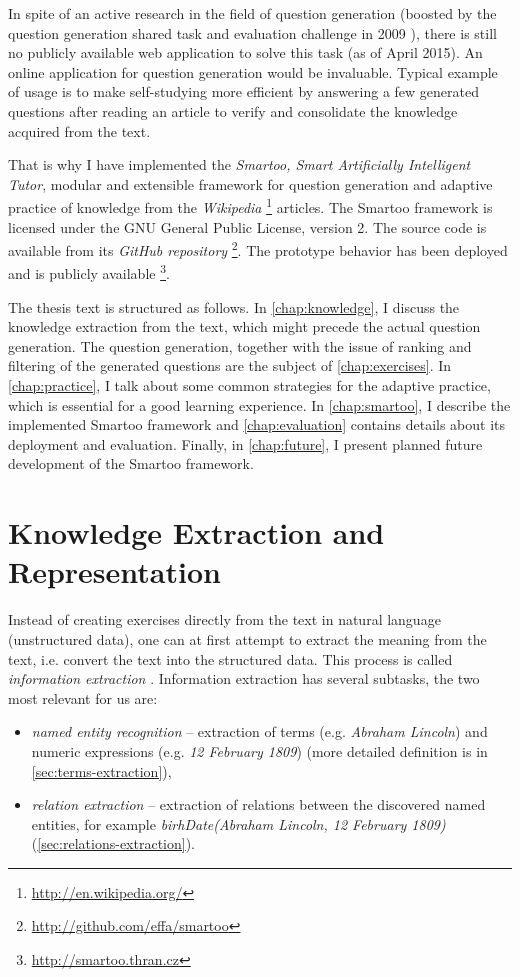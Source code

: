 \documentclass[12pt, twoside]{fithesis2}
\renewcommand{\_}{\leavevmode \kern0.07em\vbox{\hrule width0.4em}}
\newcommand{\squarebullet}{\textcolor{black}{\raisebox{0.15em}{\rule{4pt}{4pt}}}}
\newcommand{\emptysquarebullet}{\textcolor{black}{\raisebox{0.10em}{\tiny$\square$}}}
\newenvironment{myItemize}{
  \begin{itemize}[leftmargin=2em,rightmargin=1em,itemsep=\parskip ,parsep=0em,topsep=0em,partopsep=0em]
  \renewcommand{\labelitemi}{\squarebullet}
  \renewcommand{\labelitemii}{\textbullet}
}{
  \end{itemize}
}
\begin{document}
In spite of an active research in the field of question generation
(boosted by the question generation shared task and evaluation challenge in 2009 \cite{shared-task2009}),
there is still no publicly available web application to solve this task (as of April 2015).
An online application for question generation would be invaluable.
Typical example of usage is to make self-studying more efficient by answering a few generated questions after reading an article to verify and consolidate the knowledge acquired from the text.

That is why I have implemented the \textit{Smartoo, Smart Artificially Intelligent Tutor}, modular and extensible framework for question generation and adaptive practice
of knowledge from the \emph{Wikipedia}%
\footnote{\url{http://en.wikipedia.org/}}
articles.
The Smartoo framework is licensed under the GNU General Public License, version 2.
The source code is available from its \textit{GitHub repository}%
\footnote{\url{http://github.com/effa/smartoo}}.
The prototype behavior has been deployed and is publicly available%
\footnote{\url{http://smartoo.thran.cz}}.

The thesis text is structured as follows.
In \autoref{chap:knowledge}, I discuss the knowledge extraction from the text,
which might precede the actual question generation.
The question generation, together with the issue of ranking and filtering of the generated questions are the subject of \autoref{chap:exercises}.
In \autoref{chap:practice}, I talk about some common strategies for the adaptive practice, which is essential for a good learning experience.
In \autoref{chap:smartoo}, I describe the implemented Smartoo framework
and \autoref{chap:evaluation} contains details about its deployment and evaluation.
Finally, in \autoref{chap:future}, I present planned future development of the Smartoo framework.




\chapter{Knowledge Extraction and Representation}
\label{chap:knowledge}

Instead of creating exercises directly from the text in natural language (unstructured data),
one can at first attempt to extract the meaning from the text,
i.e. convert the text into the structured data.
This process is called \textit{information extraction} \cite[][262]{nlp-python}.
Information extraction has several subtasks, the two most relevant for us are:
\begin{myItemize}
  \item \textit{named entity recognition} -- extraction of terms (e.g. \textit{Abraham Lincoln}) and numeric expressions (e.g. \emph{12 February 1809}) (more detailed definition is in \autoref{sec:terms-extraction}),
  \item \textit{relation extraction} -- extraction of relations between the discovered named entities,
    for example \emph{birhDate(Abraham Lincoln, 12 February 1809)}
    (\autoref{sec:relations-extraction}).
\end{myItemize}
\end{document}
